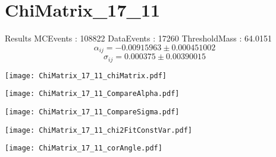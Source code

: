 \documentclass[a4paper,12pt]{article}
\begin{document}
\section{ChiMatrix\_17\_11}
\begin{minipage}{0.49\linewidth} Results \newline
MCEvents : 108822\newline
DataEvents : 17260 \newline
ThresholdMass : 64.0151\\
$$\alpha_{ij} = -0.00915963\pm 0.000451002$$
$$\sigma_{ij} = 0.000375\pm 0.00390015$$
\end{minipage}\hfill
\begin{minipage}{0.49\linewidth} 
\texttt{[image: ChiMatrix\_17\_11\_chiMatrix.pdf]}\\
\end{minipage}
\hfill
\begin{minipage}{0.49\linewidth} 
\texttt{[image: ChiMatrix\_17\_11\_CompareAlpha.pdf]}\\
\end{minipage}
\hfill
\begin{minipage}{0.49\linewidth} 
\texttt{[image: ChiMatrix\_17\_11\_CompareSigma.pdf]}\\
\end{minipage}
\begin{minipage}{0.49\linewidth} 
\texttt{[image: ChiMatrix\_17\_11\_chi2FitConstVar.pdf]}\\
\end{minipage}
\hfill
\begin{minipage}{0.49\linewidth} 
\texttt{[image: ChiMatrix\_17\_11\_corAngle.pdf]}\\
\end{minipage}
\end{document}
